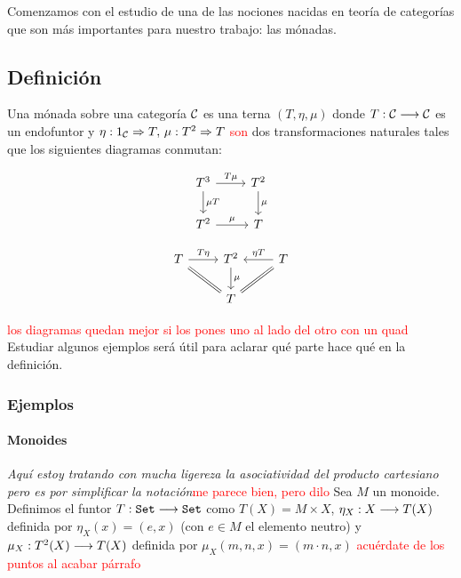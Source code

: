Comenzamos con el estudio de una de las nociones nacidas
en teoría de categorías que son
más importantes para nuestro trabajo: las mónadas.


\subsection{Definición}
\begin{definition}
  Una mónada sobre una categoría $\mathcal{C}$
  es una terna $(T, \eta, \mu)$ donde $T : \mathcal{C}\longrightarrow \mathcal{C}$ es un
  endofuntor y $\eta : 1_{\mathcal{C}}\Rightarrow T, \, \mu: T^2\Rightarrow T$ \textcolor{red}{son} dos
  transformaciones naturales tales que los siguientes diagramas
  conmutan:



  \begin{center}
    \begin{equation}\label{diagrama:mu}
    \begin{tikzcd}
      T^3 \arrow{d}{\mu T} \arrow{r}{T\mu} & T^2 \arrow{d}{\mu} \\
      T^2 \arrow{r}{\mu} & T
    \end{tikzcd}
    \end{equation}

    \begin{equation}\label{diagrama:eta}
      \begin{tikzcd}
        T \ar[equal]{dr} \arrow{r}{T\eta} & T^2 \arrow{d}{\mu} & T \arrow{l}[swap]{\eta T} \ar[equal]{ld} \\
        & T &
      \end{tikzcd}
    \end{equation}
  \end{center}
\end{definition}

\textcolor{red}{los diagramas quedan mejor si los pones uno al lado del otro con un quad}
Estudiar algunos ejemplos será útil para aclarar qué parte hace qué
en la definición.

\subsubsection{Ejemplos}
\paragraph{Monoides}
\textit{Aquí estoy tratando con mucha ligereza la asociatividad del producto cartesiano pero es por simplificar la notación}\textcolor{red}{me parece bien, pero dilo}
Sea $M$ un monoide. Definimos el funtor $T : \texttt{Set}\longrightarrow \texttt{Set}$
como $T(X) = M\times X$, $\eta_X : X\longrightarrow T(X)$ definida
por $\eta_X(x) = (e, x)$ (con $e \in M$ el elemento neutro)
y $\mu_X : T^2(X)\longrightarrow T(X)$ definida por
$\mu_X(m, n, x) = (m\cdot n, x)$ \textcolor{red}{acuérdate de los puntos al acabar párrafo}


